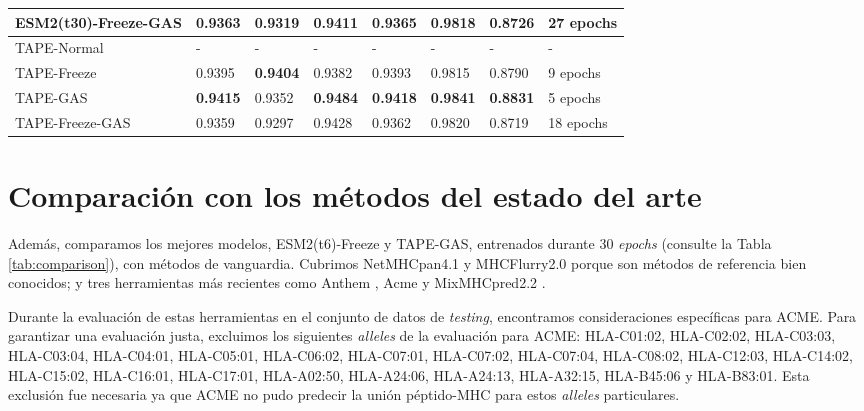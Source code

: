 \begin{table}[]
{\begin{tabular}{llllllll}
		ESM2(t30)-Freeze-GAS & 0.9363            & 0.9319             & 0.9411          & 0.9365            & \textbf{0.9818} & 0.8726          & 27 epochs           \\ \midrule
		TAPE-Normal                 & -                 & -                  & -               & -                 & -               & -               & -                   \\
		TAPE-Freeze          & 0.9395            & \textbf{0.9404}    & 0.9382          & 0.9393            & 0.9815          & 0.8790          & 9 epochs            \\
		TAPE-GAS             & \textbf{0.9415}   & 0.9352             & \textbf{0.9484} & \textbf{0.9418}   & \textbf{0.9841} & \textbf{0.8831} & 5 epochs            \\
		TAPE-Freeze-GAS      & 0.9359            & 0.9297             & 0.9428          & 0.9362            & 0.9820          & 0.8719          & 18 epochs      \\     
	\end{tabular}}
\end{table}

\section{Comparación con los métodos del estado del arte}

\sloppy
Además, comparamos los mejores modelos, ESM2(t6)-Freeze y TAPE-GAS, entrenados durante 30 \textit{epochs} (consulte la Tabla \ref{tab:comparison}), con métodos de vanguardia. Cubrimos NetMHCpan4.1 \citep{reynisson2020netmhcpan} y MHCFlurry2.0 \citep{o2020mhcflurry} porque son métodos de referencia bien conocidos; y tres herramientas más recientes como Anthem \citep{mei2021anthem}, Acme \citep{hu2019acme} y MixMHCpred2.2 \citep{gfeller2023improved}.

\sloppy
Durante la evaluación de estas herramientas en el conjunto de datos de \textit{testing}, encontramos consideraciones específicas para ACME. Para garantizar una evaluación justa, excluimos los siguientes \textit{alleles} de la evaluación para ACME: HLA-C01:02, HLA-C02:02, HLA-C03:03, HLA-C03:04, HLA-C04:01, HLA-C05:01, HLA-C06:02, HLA-C07:01, HLA-C07:02, HLA-C07:04, HLA-C08:02, HLA-C12:03, HLA-C14:02, HLA-C15:02, HLA-C16:01, HLA-C17:01, HLA-A02:50, HLA-A24:06, HLA-A24:13, HLA-A32:15, HLA-B45:06 y HLA-B83:01. Esta exclusión fue necesaria ya que ACME no pudo predecir la unión péptido-MHC para estos \textit{alleles} particulares. 


